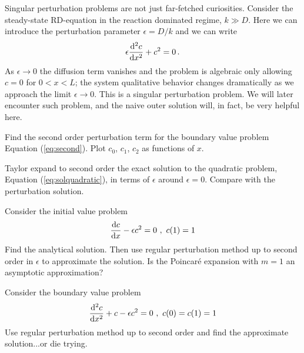 Singular perturbation problems are not just far-fetched curiosities. 
Consider the steady-state RD-equation in the reaction dominated regime, $k \gg D$. 
Here we can introduce the perturbation parameter $\epsilon = D/k$ and we can write
\begin{equation}
  \label{eq:second-singular}
  \epsilon \frac{\mathrm{d}^2c}{\mathrm{d} x^2} + c^2 = 0 \, . 
\end{equation}
As $\epsilon \rightarrow 0$ the diffusion term vanishes and the problem is algebraic only 
allowing $c=0$ for $0 < x < L$; the system qualitative behavior changes dramatically as we 
approach the limit $\epsilon \rightarrow 0$. This is a singular perturbation problem. 
We will later encounter such problem, and the naive outer solution will, in
fact, be very helpful here.  

\begin{exerciseregion}

\begin{exercise}
  Find the second order perturbation term for the boundary value problem
  Equation (\ref{eq:second}). Plot $c_0$, $c_1$, $c_2$ as functions of $x$.
\end{exercise}

\begin{exercise}
	Taylor expand to second order 
	the exact solution to the quadratic problem, Equation (\ref{eq:solquadratic}), 
	in terms of $\epsilon$ around $\epsilon=0$. Compare with the perturbation solution. 
\end{exercise}

\begin{exercise}
  Consider the initial value problem
  \begin{equation}
    \frac{\d c}{\d x} - \epsilon c^2 = 0 \ , \ c(1)=1
  \end{equation}
  	Find the analytical solution. Then use regular perturbation method
  up to second order in $\epsilon$ to approximate the solution. Is the 
  Poincar\'{e} expansion with $m=1$ an asymptotic approximation?		
\end{exercise}

\begin{exercise}
  Consider the boundary value problem
  \begin{equation}
    \frac{\mathrm{d}^2 c}{\mathrm{d} x^2} + c - \epsilon c^2 = 0 \ , \ c(0)=c(1)=1
  \end{equation}
  Use regular perturbation method up to second order and find the
  approximate solution...or die trying.
\end{exercise}


\end{exerciseregion}
